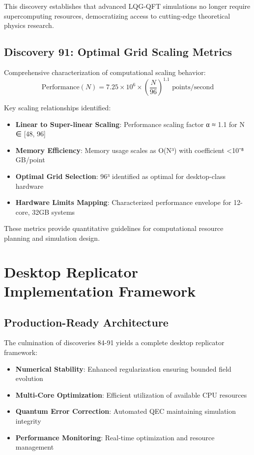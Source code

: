 \documentclass[11pt]{article}
\begin{document}
This discovery establishes that advanced LQG-QFT simulations no longer require supercomputing resources, democratizing access to cutting-edge theoretical physics research.

\subsection{Discovery 91: Optimal Grid Scaling Metrics}

Comprehensive characterization of computational scaling behavior:
\begin{equation}
\text{Performance}(N) = 7.25 \times 10^6 \times \left(\frac{N}{96}\right)^{1.1} \text{ points/second}
\end{equation}

Key scaling relationships identified:
\begin{itemize}
\item \textbf{Linear to Super-linear Scaling}: Performance scaling factor α ≈ 1.1 for N ∈ [48, 96]
\item \textbf{Memory Efficiency}: Memory usage scales as O(N³) with coefficient <10⁻⁸ GB/point
\item \textbf{Optimal Grid Selection}: 96³ identified as optimal for desktop-class hardware
\item \textbf{Hardware Limits Mapping}: Characterized performance envelope for 12-core, 32GB systems
\end{itemize}

These metrics provide quantitative guidelines for computational resource planning and simulation design.

\section{Desktop Replicator Implementation Framework}

\subsection{Production-Ready Architecture}

The culmination of discoveries 84-91 yields a complete desktop replicator framework:
\begin{itemize}
\item \textbf{Numerical Stability}: Enhanced regularization ensuring bounded field evolution
\item \textbf{Multi-Core Optimization}: Efficient utilization of available CPU resources
\item \textbf{Quantum Error Correction}: Automated QEC maintaining simulation integrity
\item \textbf{Performance Monitoring}: Real-time optimization and resource management
\end{itemize}
\end{document}
